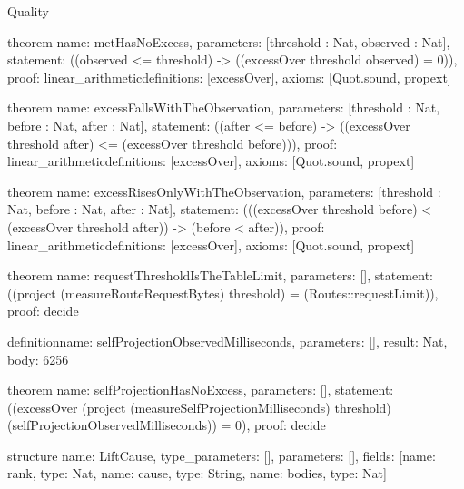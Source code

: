 \begin{lexlean}{Quality}
\begin{semanticmodule}
theorem{
  name: metHasNoExcess,
  parameters: [threshold : Nat, observed : Nat],
  statement: ((observed <= threshold) -> ((excessOver threshold observed) = 0)),
  proof: linear_arithmetic{definitions: [excessOver]},
  axioms: [Quot.sound, propext]
}

theorem{
  name: excessFallsWithTheObservation,
  parameters: [threshold : Nat, before : Nat, after : Nat],
  statement: ((after <= before) -> ((excessOver threshold after) <= (excessOver threshold before))),
  proof: linear_arithmetic{definitions: [excessOver]},
  axioms: [Quot.sound, propext]
}

theorem{
  name: excessRisesOnlyWithTheObservation,
  parameters: [threshold : Nat, before : Nat, after : Nat],
  statement: (((excessOver threshold before) < (excessOver threshold after)) -> (before < after)),
  proof: linear_arithmetic{definitions: [excessOver]},
  axioms: [Quot.sound, propext]
}

theorem{
  name: requestThresholdIsTheTableLimit,
  parameters: [],
  statement: ((project (measureRouteRequestBytes) threshold) = (Routes::requestLimit)),
  proof: decide{}
}

definition{name: selfProjectionObservedMilliseconds, parameters: [], result: Nat, body: 6256}

theorem{
  name: selfProjectionHasNoExcess,
  parameters: [],
  statement: ((excessOver (project (measureSelfProjectionMilliseconds) threshold) (selfProjectionObservedMilliseconds)) = 0),
  proof: decide{}
}

structure{
  name: LiftCause,
  type_parameters: [],
  parameters: [],
  fields: [{name: rank, type: Nat}, {name: cause, type: String}, {name: bodies, type: Nat}]
}


\end{semanticmodule}
\end{lexlean}
